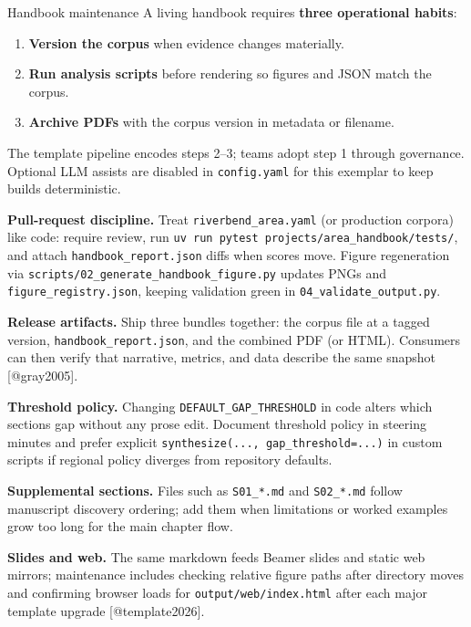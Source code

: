 \documentclass[
  ignorenonframetext,
]{beamer}
\author{\texorpdfstring{}{}}
\date{}
\providecommand{\tightlist}{%
  \setlength{\itemsep}{0pt}\setlength{\parskip}{0pt}}
\begin{document}
\begin{frame}[fragile]{Handbook maintenance}
\protect{}\label{handbook-maintenance}
A living handbook requires \textbf{three operational habits}:

\begin{enumerate}
\tightlist
\item
  \textbf{Version the corpus} when evidence changes materially.
\item
  \textbf{Run analysis scripts} before rendering so figures and JSON
  match the corpus.
\item
  \textbf{Archive PDFs} with the corpus version in metadata or filename.
\end{enumerate}

The template pipeline encodes steps 2--3; teams adopt step 1 through
governance. Optional LLM assists are disabled in \texttt{config.yaml}
for this exemplar to keep builds deterministic.

\textbf{Pull-request discipline.} Treat \texttt{riverbend\_area.yaml}
(or production corpora) like code: require review, run
\texttt{uv\ run\ pytest\ projects/area\_handbook/tests/}, and attach
\texttt{handbook\_report.json} diffs when scores move. Figure
regeneration via \texttt{scripts/02\_generate\_handbook\_figure.py}
updates PNGs and \texttt{figure\_registry.json}, keeping validation
green in \texttt{04\_validate\_output.py}.

\textbf{Release artifacts.} Ship three bundles together: the corpus file
at a tagged version, \texttt{handbook\_report.json}, and the combined
PDF (or HTML). Consumers can then verify that narrative, metrics, and
data describe the same snapshot {[}@gray2005{]}.

\textbf{Threshold policy.} Changing \texttt{DEFAULT\_GAP\_THRESHOLD} in
code alters which sections gap without any prose edit. Document
threshold policy in steering minutes and prefer explicit
\texttt{synthesize(...,\ gap\_threshold=...)} in custom scripts if
regional policy diverges from repository defaults.

\textbf{Supplemental sections.} Files such as \texttt{S01\_*.md} and
\texttt{S02\_*.md} follow manuscript discovery ordering; add them when
limitations or worked examples grow too long for the main chapter flow.

\textbf{Slides and web.} The same markdown feeds Beamer slides and
static web mirrors; maintenance includes checking relative figure paths
after directory moves and confirming browser loads for
\texttt{output/web/index.html} after each major template upgrade
{[}@template2026{]}.
\end{frame}
\end{document}
